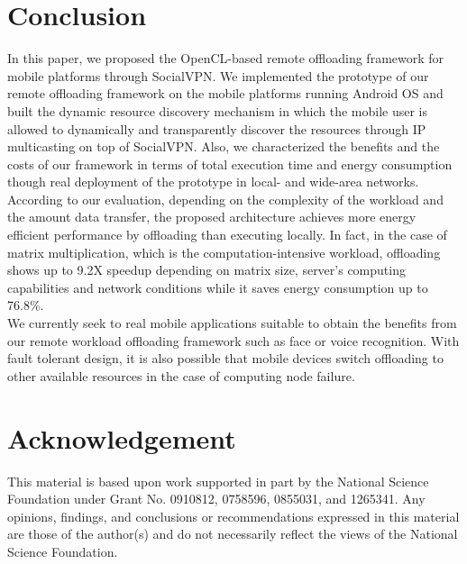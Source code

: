 \documentclass[10pt, conference, compsocconf]{IEEEtran}
\begin{document}
\section{Conclusion}
%
In this paper, we proposed the OpenCL-based remote offloading framework
for mobile platforms through SocialVPN.
%
We implemented the prototype of our remote offloading framework on the
mobile platforms running Android OS and built the dynamic resource
discovery mechanism in which the mobile user is allowed to dynamically
and transparently discover the resources through IP multicasting on top
of SocialVPN.
%
Also, we characterized the benefits and the costs of our framework in
terms of total execution time and energy consumption though real
deployment of the prototype in local- and wide-area networks.
%
According to our evaluation, depending on the complexity of the workload
and the amount data transfer, the proposed architecture achieves more
energy efficient performance by offloading than executing locally.
%
In fact, in the case of matrix multiplication, which is the
computation-intensive workload, offloading shows up to 9.2X speedup
depending on matrix size, server's computing capabilities and network
conditions while it saves energy consumption up to 76.8\%.\\
%
\indent We currently seek to real mobile applications suitable to obtain the
benefits from our remote workload offloading framework such as face or
voice recognition.
%
With fault tolerant design, it is also possible that mobile devices
switch offloading to other available resources in the case of computing
node failure.
%
\section*{Acknowledgement}
This material is based upon work supported in part by the National Science
Foundation under Grant No. 0910812, 0758596, 0855031, and 1265341.
%
Any opinions, findings, and conclusions or recommendations expressed in
this material are those of the author(s) and do not necessarily reflect
the views of the National Science Foundation.
%
%

\end{document}
